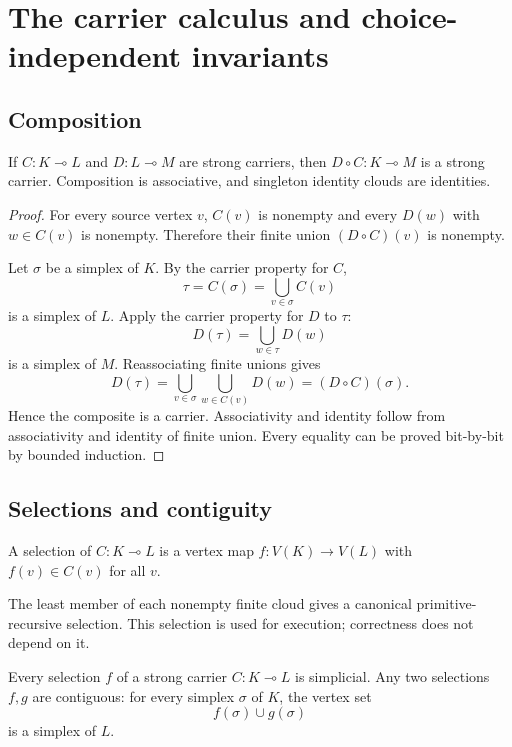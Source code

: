 
\section{The carrier calculus and choice-independent invariants}
\label{sec:carriers}

\subsection{Composition}

\begin{theorem}
\label{thm:carrier-composition}
If $C:K\multimap L$ and $D:L\multimap M$ are strong carriers, then $D\circ C:K\multimap M$ is a strong carrier.  Composition is associative, and singleton identity clouds are identities.
\end{theorem}

\begin{proof}
For every source vertex $v$, $C(v)$ is nonempty and every $D(w)$ with $w\in C(v)$ is nonempty.  Therefore their finite union $(D\circ C)(v)$ is nonempty.

Let $\sigma$ be a simplex of $K$.  By the carrier property for $C$,
\[
  \tau=C(\sigma)=\bigcup_{v\in\sigma}C(v)
\]
is a simplex of $L$.  Apply the carrier property for $D$ to $\tau$:
\[
  D(\tau)=\bigcup_{w\in\tau}D(w)
\]
is a simplex of $M$.  Reassociating finite unions gives
\[
  D(\tau)
  =\bigcup_{v\in\sigma}\bigcup_{w\in C(v)}D(w)
  =(D\circ C)(\sigma).
\]
Hence the composite is a carrier.  Associativity and identity follow from associativity and identity of finite union.  Every equality can be proved bit-by-bit by bounded induction.
\end{proof}

\subsection{Selections and contiguity}

\begin{definition}[Selection]
A selection of $C:K\multimap L$ is a vertex map $f:V(K)\to V(L)$ with $f(v)\in C(v)$ for all $v$.
\end{definition}

The least member of each nonempty finite cloud gives a canonical primitive-recursive selection.  This selection is used for execution; correctness does not depend on it.

\begin{theorem}
\label{thm:selection}
Every selection $f$ of a strong carrier $C:K\multimap L$ is simplicial.  Any two selections $f,g$ are contiguous: for every simplex $\sigma$ of $K$, the vertex set
\[
  f(\sigma)\cup g(\sigma)
\]
is a simplex of $L$.
\end{theorem}

